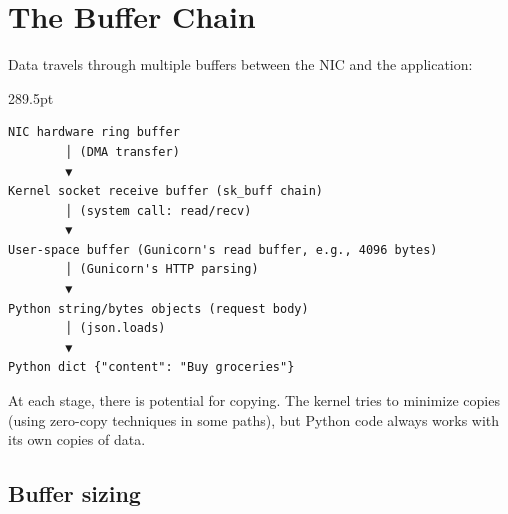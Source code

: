 \setcounter{section}{4}
\section{The Buffer Chain}\label{30-kernel-application-handoff:305-the-buffer-chain}

Data travels through multiple buffers between the NIC and the application:

\begin{diagrambox}[short]{289.5pt}
\begin{Verbatim}[fontsize=\fontsize{9.0}{8.55}\selectfont]
NIC hardware ring buffer
        │ (DMA transfer)
        ▼
Kernel socket receive buffer (sk_buff chain)
        │ (system call: read/recv)
        ▼
User-space buffer (Gunicorn's read buffer, e.g., 4096 bytes)
        │ (Gunicorn's HTTP parsing)
        ▼
Python string/bytes objects (request body)
        │ (json.loads)
        ▼
Python dict {"content": "Buy groceries"}
\end{Verbatim}
\end{diagrambox}

\noindent{}At each stage, there is potential for copying. The kernel tries to minimize copies (using zero-copy techniques in some paths), but Python code always works with its own copies of data.

\subsection*{Buffer sizing}\label{30-kernel-application-handoff:buffer-sizing}

\begin{codebox}[short]

\begin{Shaded}
\begin{Highlighting}[]
\OperatorTok{=}   


\end{Highlighting}
\end{Shaded}

\end{codebox}

